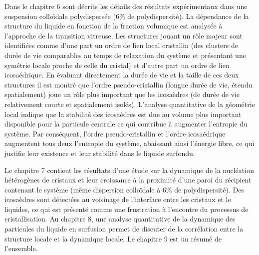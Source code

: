 \documentclass[10pt,a4paper]{article}
\begin{document}
Dans le chapitre 6 sont décrits les détails des résultats expérimentaux dans une suspension colloïdale polydispersée (6\% de polydispersité). La dépendance de la structure du liquide en fonction de la fraction volumique est analysée à l'approche de la transition vitreuse. Les structures jouant un rôle majeur sont identifiées comme d'une part un ordre de lien local cristallin (des clusters de durée de vie comparables au temps de relaxation du système et présentant une symétrie locale proche de celle du cristal) et d'autre part un ordre de lien icosaédrique. En évaluant directement la durée de vie et la taille de ces deux structures il est montré que l'ordre pseudo-cristallin (longue durée de vie, étendu spatialement) joue un rôle plus important que les icosaèdres (de durée de vie relativement courte et spatialement isolés). L'analyse quantitative de la géométrie local indique que la stabilité des icosaèdres est due au volume plus important disponible pour la particule centrale ce qui contribue à augmenter l'entropie du système. Par conséquent, l'ordre pseudo-cristallin et l'ordre icosaédrique augmentent tous deux l'entropie du système, abaissant ainsi l'énergie libre, ce qui justifie leur existence et leur stabilité dans le liquide surfondu.

Le chapitre 7 contient les résultats d'une étude sur la dynamique de la nucléation hétérogènes de cristaux et leur croissance à la proximité d'une paroi du récipient contenant le système (même dispersion colloïdale à 6\% de polydispersité). Des icosaèdres sont détectées au voisinage de l'interface entre les cristaux et le liquides, ce qui est présenté comme une frustration à l'encontre du processus de cristallisation. Au chapitre 8, une analyse quantitative de la dynamique des particules du liquide en surfusion permet de discuter de la corrélation entre la structure locale et la dynamique locale. Le chapitre 9 est un résumé de l'ensemble.

\bigskip
\end{document}
